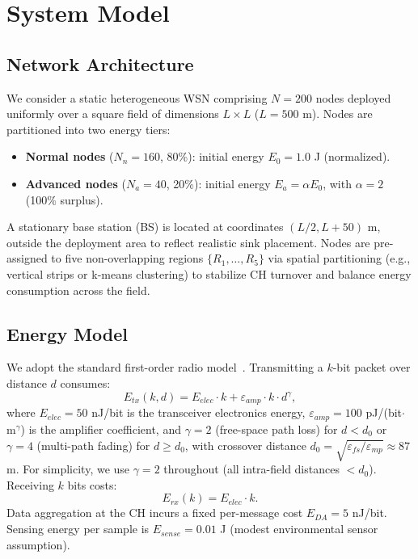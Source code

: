 \section{System Model}
\label{sec:system-model}

\subsection{Network Architecture}
We consider a static heterogeneous WSN comprising $N=200$ nodes deployed uniformly over a square field of dimensions $L \times L$ ($L=500$ m). Nodes are partitioned into two energy tiers:
\begin{itemize}[noitemsep]
  \item \textbf{Normal nodes} ($N_n = 160$, 80\%): initial energy $E_0 = 1.0$ J (normalized).
  \item \textbf{Advanced nodes} ($N_a = 40$, 20\%): initial energy $E_a = \alpha E_0$, with $\alpha=2$ (100\% surplus).
\end{itemize}
A stationary base station (BS) is located at coordinates $(L/2, L + 50)$ m, outside the deployment area to reflect realistic sink placement. Nodes are pre-assigned to five non-overlapping regions $\{R_1, \ldots, R_5\}$ via spatial partitioning (e.g., vertical strips or k-means clustering) to stabilize CH turnover and balance energy consumption across the field.

\subsection{Energy Model}
We adopt the standard first-order radio model~\cite{heinzelman2000leach}. Transmitting a $k$-bit packet over distance $d$ consumes:
\begin{equation}
E_{tx}(k,d) = E_{elec} \cdot k + \varepsilon_{amp} \cdot k \cdot d^\gamma,
\label{eq:etx}
\end{equation}
where $E_{elec}=50$ nJ/bit is the transceiver electronics energy, $\varepsilon_{amp}=100$ pJ/(bit$\cdot$m$^\gamma$) is the amplifier coefficient, and $\gamma=2$ (free-space path loss) for $d < d_0$ or $\gamma=4$ (multi-path fading) for $d \ge d_0$, with crossover distance $d_0 = \sqrt{\varepsilon_{fs}/\varepsilon_{mp}} \approx 87$ m. For simplicity, we use $\gamma=2$ throughout (all intra-field distances $<d_0$). Receiving $k$ bits costs:
\begin{equation}
E_{rx}(k) = E_{elec} \cdot k.
\end{equation}
Data aggregation at the CH incurs a fixed per-message cost $E_{DA}=5$ nJ/bit. Sensing energy per sample is $E_{sense}=0.01$ J (modest environmental sensor assumption).

